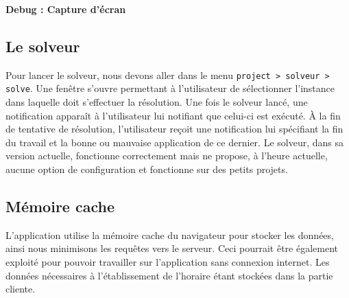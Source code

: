 \textbf{Debug : Capture d'écran}


\subsection{Le solveur}
Pour lancer le solveur, nous devons aller dans le menu \texttt{project > solveur > solve}. Une fenêtre s'ouvre permettant à l'utilisateur de sélectionner l'instance dans laquelle doit s'effectuer la résolution. Une fois le solveur lancé, une notification apparaît à l'utilisateur lui notifiant que celui-ci est exécuté. À la fin de tentative de résolution, l'utilisateur reçoit une notification lui spécifiant la fin du travail et la bonne ou mauvaise application de ce dernier. Le solveur, dans sa version actuelle, fonctionne correctement mais ne propose, à l'heure actuelle, aucune option de configuration et fonctionne sur des petits projets. 


\subsection{Mémoire cache}
L'application utilise la mémoire cache du navigateur pour stocker les données, ainsi nous minimisons les requêtes vers le serveur. Ceci pourrait être également exploité pour pouvoir travailler sur l'application sans connexion internet. Les données nécessaires à l'établissement de l'horaire étant stockées dans la partie cliente.



















